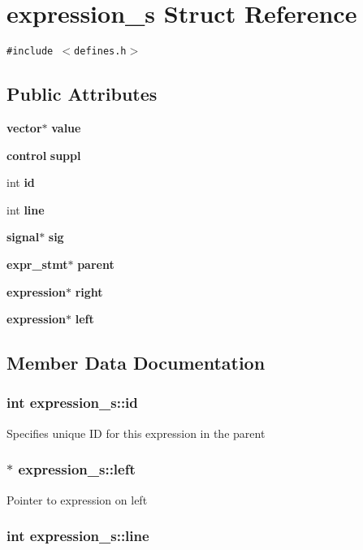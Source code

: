 \section{expression\_\-s  Struct Reference}
\label{structexpression__s}
{\tt \#include $<$defines.h$>$}

\subsection*{Public Attributes}
\begin{CompactItemize}
\item 
{\bf vector}$\ast$ {\bf value}
\item 
{\bf control} {\bf suppl}
\item 
int {\bf id}
\item 
int {\bf line}
\item 
{\bf signal}$\ast$ {\bf sig}
\item 
{\bf expr\_\-stmt}$\ast$ {\bf parent}
\item 
{\bf expression}$\ast$ {\bf right}
\item 
{\bf expression}$\ast$ {\bf left}
\end{CompactItemize}


\subsection{Member Data Documentation}
\subsubsection{\setlength{\rightskip}{0pt plus 5cm}int expression\_\-s::id}\label{structexpression__s_m2}


Specifies unique ID for this expression in the parent 
\subsubsection{ $\ast$ expression\_\-s::left}\label{structexpression__s_m7}


Pointer to expression on left 
\subsubsection{\setlength{\rightskip}{0pt plus 5cm}int expression\_\-s::line}\label{structexpression__s_m3}


